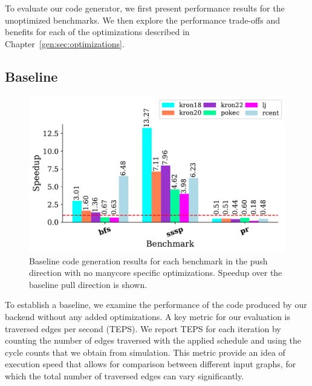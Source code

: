 To evaluate our code generator, we first present performance results for the unoptimized benchmarks. 
We then explore the performance trade-offs and benefits for each of the optimizations described in Chapter~\ref{gen:sec:optimizations}.

\subsection{Baseline}
 
\begin{figure}[!ht]
    \centering
    \includegraphics[scale = 0.6]{graphit-figures/push.pdf}
    \caption{Baseline code generation results for each benchmark in the push direction with no manycore specific optimizations. Speedup over the baseline pull direction is shown.}
    \label{pap:generals:sec:eval:fig:push}
\end{figure}
To establish a baseline, we examine the performance of the code produced by our backend without any added optimizations.
A key metric for our evaluation is traversed edges per second (TEPS).
We report TEPS for each iteration by counting the number of edges traversed with the applied \graphit schedule and using the cycle counts that we obtain from simulation.
This metric provide an idea of execution speed that allows for comparison between different input graphs, for which the total number of traversed edges can vary significantly.

